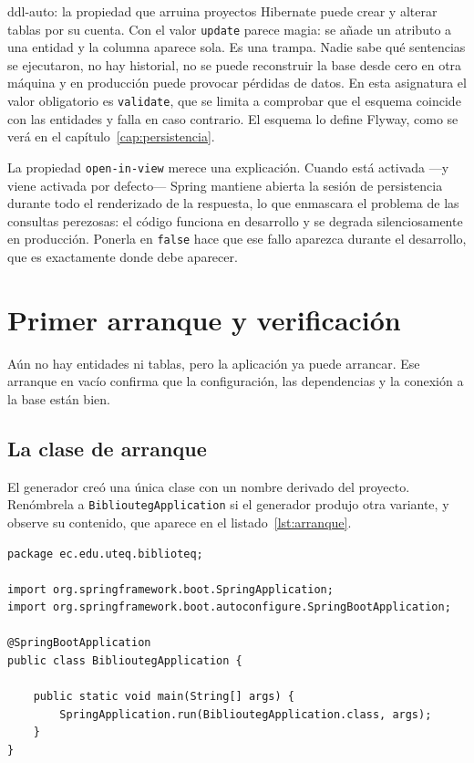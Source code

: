\documentclass[11pt,a4paper,openany]{book}
\begin{document}
\begin{cajaadvertencia}{ddl-auto: la propiedad que arruina proyectos}
	Hibernate puede crear y alterar tablas por su cuenta. Con el valor \texttt{update} parece magia: se añade un atributo a una entidad y la columna aparece sola. Es una trampa. Nadie sabe qué sentencias se ejecutaron, no hay historial, no se puede reconstruir la base desde cero en otra máquina y en producción puede provocar pérdidas de datos. En esta asignatura el valor obligatorio es \texttt{validate}, que se limita a comprobar que el esquema coincide con las entidades y falla en caso contrario. El esquema lo define Flyway, como se verá en el capítulo~\ref{cap:persistencia}.
\end{cajaadvertencia}

La propiedad \texttt{open-in-view} merece una explicación. Cuando está activada ---y viene activada por defecto--- Spring mantiene abierta la sesión de persistencia durante todo el renderizado de la respuesta, lo que enmascara el problema de las consultas perezosas: el código funciona en desarrollo y se degrada silenciosamente en producción. Ponerla en \texttt{false} hace que ese fallo aparezca durante el desarrollo, que es exactamente donde debe aparecer.

\section{Primer arranque y verificación}
\label{sec:primer-arranque}

Aún no hay entidades ni tablas, pero la aplicación ya puede arrancar. Ese arranque en vacío confirma que la configuración, las dependencias y la conexión a la base están bien.

\subsection{La clase de arranque}
\label{sec:clase-arranque}

El generador creó una única clase con un nombre derivado del proyecto. Renómbrela a \texttt{BiblioutegApplication} si el generador produjo otra variante, y observe su contenido, que aparece en el listado~\ref{lst:arranque}.

\begin{lstlisting}[style=java,caption={Clase de arranque de la aplicacion.},label={lst:arranque}]
package ec.edu.uteq.biblioteq;

import org.springframework.boot.SpringApplication;
import org.springframework.boot.autoconfigure.SpringBootApplication;

@SpringBootApplication
public class BiblioutegApplication {

	public static void main(String[] args) {
		SpringApplication.run(BiblioutegApplication.class, args);
	}
}
\end{lstlisting}
\end{document}
